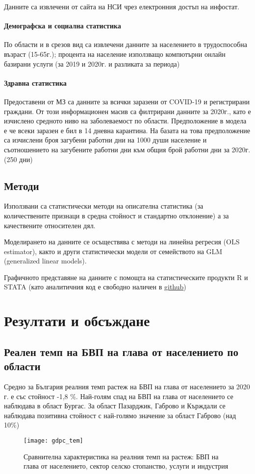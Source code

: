 \documentclass[a4paper,12pt]{article}
\begin{document}
Данните са извлечени от сайта на НСИ чрез електронния достъп на инфостат. 
\paragraph{Демографска и социална статистика}
По области и в срезов вид са извлечени данните за населението в трудоспособна възраст (15-65г.); процента на население използващо компютърни онлайн базирани услуги (за 2019 и 2020г. и разликата за периода)

\paragraph{Здравна статистика}
Предоставени от МЗ са данните за всички заразени от COVID-19 и регистрирани граждани. От този информационен масив са филтрирани данните за 2020г., като е изчислено средното ниво на заболеваемост по области. Предположение в модела е че всеки заразен е бил в 14 дневна карантина. На базата на това предположение са изчислени броя загубени работни дни на 1000 души население и съотношението на загубените работни дни към общия брой работни дни за 2020г. (250 дни)

\subsection{Методи}
Използвани са статистически методи на описателна статистика (за количествените признаци в средна стойност и стандартно отклонение) а за качествените относителен дял.

Моделирането на данните се осъществява с методи на линейна регресия (OLS estimator), както и други статистически модели от семейството на GLM (generalized linear models). 

Графичното представяне на данните с помощта на статистическите продукти R и STATA (като аналитичния код е свободно наличен в \href{https://github.com/kostadinoff/macroeconomics_SU_project.git}{github})
\section{Резултати и обсъждане}

\subsection{Реален темп на БВП на глава от населението по области}
Средно за България реалния темп растеж на БВП на глава от населението за 2020 г. е със стойност -1,8 \%. Най-голям спад на БВП на глава от населението се наблюдава в област Бургас. За област Пазарджик, Габрово и Кърждали се наблюдава позитивна стойност с най-голямо значение за област Габрово (над 10\%)
\newpage
\begin{figure}[H]
	\centering
	\texttt{[image: gdpc\_tem]}
	\caption{Сравнителна характеристика на реалния темп на растеж: БВП на глава от населението, сектор селско стопанство, услуги и индустрия}
	\label{fig:gdpctem}
\end{figure}
\newpage
\end{document}
